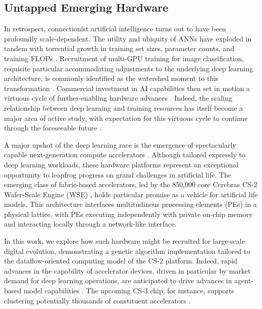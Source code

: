\subsection{Untapped Emerging Hardware}

In retrospect, connectionist artificial intelligence turns out to have been profoundly scale-dependent.
The utility and ubiquity of ANNs have exploded in tandem with torrential growth in training set sizes, parameter counts, and training FLOPs \citep{marcus2018deep}.
Recruitment of multi-GPU training for image classification, requisite particular accommodating adjustments to the underlying deep learning architecture, is commonly identified as the watershed moment to this transformation
 \citep{krizhevsky2012imagenet}.
Commercial investment in AI capabilities then set in motion a virtuous cycle of further-enabling hardware advances \citep{jouppi2017datacenter}.
Indeed, the scaling relationship between deep learning and training resources has itself become a major area of active study, with expectation for this virtuous cycle to continue through the foreseeable future \citep{kaplan2020scaling}.

A major upshot of the deep learning race is the emergence of spectacularly capable next-generation compute accelerators \citep{zhang2016cambricon,emani2021accelerating,jia2019dissecting,medina2020habana}.
Although tailored expressly to deep learning workloads, these hardware platforms represent an exceptional opportunity to leapfrog progress on grand challenges in artificial life.
The emerging class of fabric-based accelerators, led by the 850,000 core Cerebras CS-2 Wafer-Scale Engine (WSE) \citep{lauterbach2021path,lie2022cerebras}, holds particular promise as a vehicle for artificial life models.
This architecture interfaces multitudinous processing elements (PEs) in a physical lattice, with PEs executing independently with private on-chip memory and interacting locally through a network-like interface.

In this work, we explore how such hardware might be recruited for large-scale digital evolution, demonstrating a genetic algorithm implementation tailored to the dataflow-oriented computing model of the CS-2 platform.
Indeed, rapid advances in the capability of accelerator devices, driven in particular by market demand for deep learning operations, are anticipated to drive advances in agent-based model capabilities \citep{perumalla2022computer}.
The upcoming CS-3 chip, for instance, supports clustering potentially thousands of constituent accelerators \citep{moore2024cerebras}.


